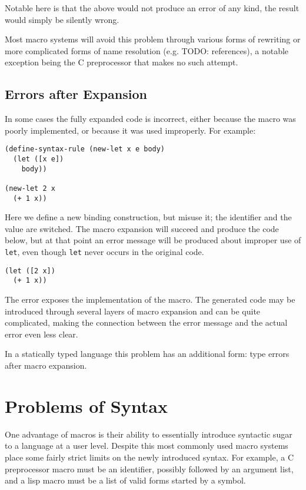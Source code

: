 \documentclass{kththesis}
\begin{document}
Notable here is that the above would not produce an error of any kind, the result would simply be silently wrong.

Most macro systems will avoid this problem through various forms of rewriting or more complicated forms of name resolution (e.g. \cite{Flatt:2016:BSS:2837614.2837620} TODO: references), a notable exception being the C preprocessor that makes no such attempt.

\subsection{Errors after Expansion}

In some cases the fully expanded code is incorrect, either because the macro was poorly implemented, or because it was used improperly. For example:

\begin{verbatim}
(define-syntax-rule (new-let x e body)
  (let ([x e])
    body))

(new-let 2 x
  (+ 1 x))
\end{verbatim}

Here we define a new binding construction, but misuse it; the identifier and the value are switched. The macro expansion will succeed and produce the code below, but at that point an error message will be produced about improper use of \texttt{let}, even though \texttt{let} never occurs in the original code.

\begin{verbatim}
(let ([2 x])
  (+ 1 x))
\end{verbatim}

The error exposes the implementation of the macro. The generated code may be introduced through several layers of macro expansion and can be quite complicated, making the connection between the error message and the actual error even less clear.

In a statically typed language this problem has an additional form: type errors after macro expansion.

\section{Problems of Syntax} \label{sec:problem-syntax}

One advantage of macros is their ability to essentially introduce syntactic sugar to a language at a user level. Despite this most commonly used macro systems place some fairly strict limits on the newly introduced syntax. For example, a C preprocessor macro must be an identifier, possibly followed by an argument list, and a lisp macro must be a list of valid forms started by a symbol.
\end{document}
